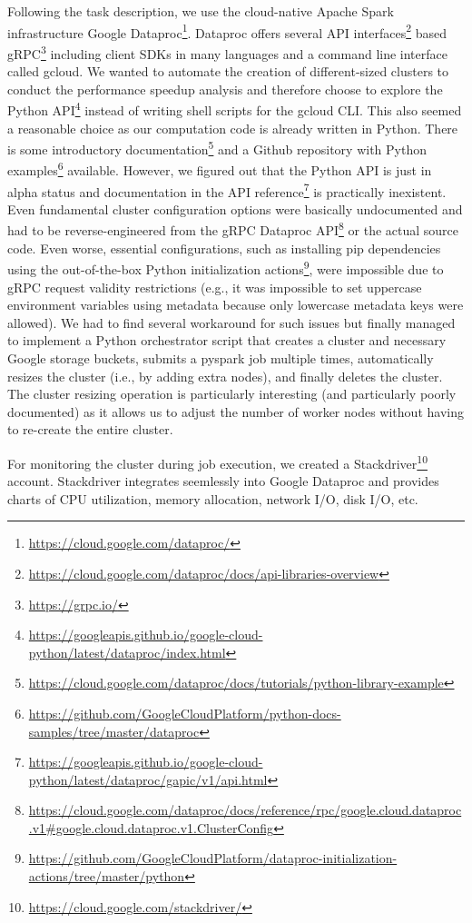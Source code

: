 \documentclass{prog_report}
\newcommand{\footurl}[1]{\footnote{\url{#1}}}
\begin{document}
Following the task description, we use the cloud-native Apache Spark infrastructure Google Dataproc\footurl{https://cloud.google.com/dataproc/}.
Dataproc offers several API interfaces\footurl{https://cloud.google.com/dataproc/docs/api-libraries-overview} based gRPC\footurl{https://grpc.io/} including client SDKs in many languages and a command line interface called gcloud.
We wanted to automate the creation of different-sized clusters to conduct the performance speedup analysis and therefore choose to explore the Python API\footurl{https://googleapis.github.io/google-cloud-python/latest/dataproc/index.html} instead of writing shell scripts for the gcloud CLI.
This also seemed a reasonable choice as our computation code is already written in Python.
There is some introductory documentation\footurl{https://cloud.google.com/dataproc/docs/tutorials/python-library-example} and a Github repository with Python examples\footurl{https://github.com/GoogleCloudPlatform/python-docs-samples/tree/master/dataproc} available.
However, we figured out that the Python API is just in alpha status and documentation in the API reference\footurl{https://googleapis.github.io/google-cloud-python/latest/dataproc/gapic/v1/api.html} is practically inexistent.
Even fundamental cluster configuration options were basically undocumented and had to be reverse-engineered from the gRPC Dataproc API\footurl{https://cloud.google.com/dataproc/docs/reference/rpc/google.cloud.dataproc.v1\#google.cloud.dataproc.v1.ClusterConfig} or the actual source code.
Even worse, essential configurations, such as installing pip dependencies using the out-of-the-box Python initialization actions\footurl{https://github.com/GoogleCloudPlatform/dataproc-initialization-actions/tree/master/python}, were impossible due to gRPC request validity restrictions (e.g., it was impossible to set uppercase environment variables using metadata because only lowercase metadata keys were allowed).
We had to find several workaround for such issues but finally managed to implement a Python orchestrator script that creates a cluster and necessary Google storage buckets, submits a pyspark job multiple times, automatically resizes the cluster (i.e., by adding extra nodes), and finally deletes the cluster.
The cluster resizing operation is particularly interesting (and particularly poorly documented) as it allows us to adjust the number of worker nodes without having to re-create the entire cluster.

For monitoring the cluster during job execution, we created a Stackdriver\footurl{https://cloud.google.com/stackdriver/} account.
Stackdriver integrates seemlessly into Google Dataproc and provides charts of CPU utilization, memory allocation, network I/O, disk I/O, etc.
\end{document}
